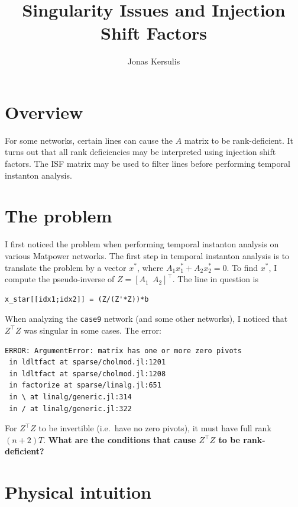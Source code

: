 \documentclass[10pt,letterpaper]{article}
\author{Jonas Kersulis}
\title{Singularity Issues and Injection Shift Factors}
\begin{document}
\date{}
\maketitle

    \section*{Overview}\label{overview}

For some networks, certain lines can cause the \(A\) matrix to be
rank-deficient. It turns out that all rank deficiencies may be interpreted using injection shift
factors. The ISF matrix may be used to filter lines before performing
temporal instanton analysis.

    \section*{The problem}\label{the-problem}

I first noticed the problem when performing temporal instanton analysis on various Matpower
networks. The first step in temporal instanton analysis is to translate
the problem by a vector \(x^*\), where \(A_1x_1^* + A_2x_2^* = 0\). To
find \(x^*\), I compute the pseudo-inverse of
\(Z = [A_1~~A_2]^\top\). The line in question is

\begin{verbatim}
x_star[[idx1;idx2]] = (Z/(Z'*Z))*b
\end{verbatim}

When analyzing the \texttt{case9} network (and some other networks), I noticed that \(Z^\top Z\)
was singular in some cases. The error:

\begin{verbatim}
ERROR: ArgumentError: matrix has one or more zero pivots
 in ldltfact at sparse/cholmod.jl:1201
 in ldltfact at sparse/cholmod.jl:1208
 in factorize at sparse/linalg.jl:651
 in \ at linalg/generic.jl:314
 in / at linalg/generic.jl:322
\end{verbatim}

For \(Z^\top Z\) to be invertible (i.e.~have no zero pivots), it must
have full rank \((n+2)T\). \textbf{What are the conditions that cause
\(Z^\top Z\) to be rank-deficient?}

    \section*{Physical intuition}\label{physical-intuition}
\end{document}
